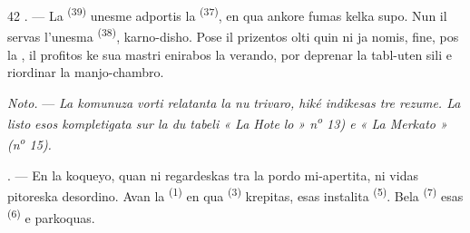 \begin{VUpage}[44]{42}
. --- La  \textsuperscript{(39)} unesme adportis la \cc
{} \textsuperscript{(37)}, en qua ankore fumas kelka supo.\nl
Nun il servas l'unesma  \textsuperscript{(38)}, karno-disho.\nl
Pose il prizentos olti quin ni ja nomis, fine,\nl
pos la , il profitos ke sua mastri\nl
enirabos la verando, por deprenar la tabl-uten\cc
sili e riordinar la manjo-chambro.

\VUblancAlinea
\textit{Noto.} --- \textit{La komunuza vorti relatanta la nu}\cc
\textit{trivaro, hiké indikesas tre rezume. La listo}\nl
\textit{esos kompletigata sur la du tabeli « La Hote}\cc
\textit{lo » n\textsuperscript{o} 13) e « La Merkato » (n\textsuperscript{o} 15).}

\VUsaut{4.6mm}
\VUsaut{3.0mm}

. --- En la koqueyo, quan ni regardeskas\nl
tra la pordo mi-apertita, ni vidas pitoreska\nl
desordino. Avan la  \textsuperscript{(1)} en qua  \textsuperscript{(3)}\nl
krepitas, esas instalita  \textsuperscript{(5)}. Bela\nl
{} \textsuperscript{(7)} esas  \textsuperscript{(6)} e parkoquas.
\end{VUpage}

